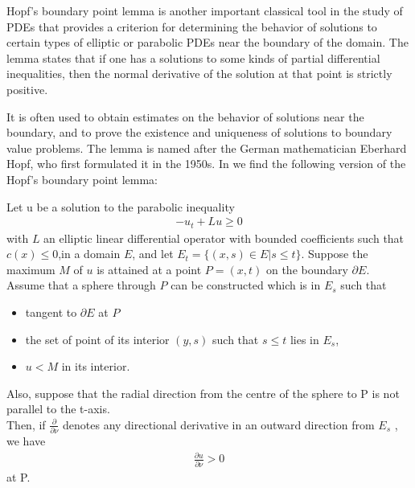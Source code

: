Hopf's boundary point lemma is another important classical tool in the study of PDEs that provides a criterion for determining the behavior of solutions to certain types of elliptic or parabolic PDEs near the boundary of the domain. The lemma states that if one has a solutions to some kinds of partial differential inequalities, then the normal derivative of the solution at that point is strictly positive.

It is often used to obtain estimates on the behavior of solutions near the boundary, and to prove the existence and uniqueness of solutions to boundary value problems. The lemma is named after the German mathematician Eberhard Hopf, who first formulated it in the 1950s. In \cite{protterweinberger} we find the following version of the Hopf's boundary point lemma:

\begin{theorem}
	Let u be a solution to the parabolic inequality 
	\begin{align*}
		-u_t+Lu\geq 0
	\end{align*} 
	with $L$ an elliptic linear differential operator with bounded coefficients such that $c(x)\leq 0$,in a domain $E$, and let $E_t = \{(x, s) \in E | s \leq t\}$. Suppose the maximum $M$ of $u$ is attained at a point $P=(x, t)$ on the boundary $\partial E$. \\
	Assume that a sphere through $P$ can be constructed which is in $E_s$ such that
	\begin{itemize}\itemsep0em 
		\item tangent to $\partial E$ at $P$
		\item the set of point of its interior $(y, s)$ such that $s\leq t$ lies in $E_s$, 
		\item  $u < M$ in its interior.
	\end{itemize}	
	Also, suppose that the radial direction from the centre of the sphere to P is not parallel to the t-axis. \\
	Then, if $\frac{\partial}{\partial \nu}$ denotes any directional derivative in an outward direction from $E_s$ , we have
	\begin{align*}
		\frac{\partial u}{\partial \nu} > 0
	\end{align*}
	at P.\label{HopfBPL}
\end{theorem}
